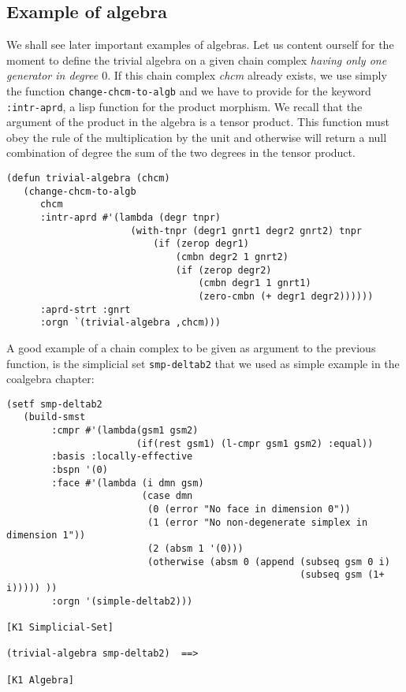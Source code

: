 \subsection {Example of algebra}

We shall see later important examples of algebras. Let us content ourself for the moment
to define the trivial algebra on a given chain complex {\em having only one generator in degree $0$}. 
If  this chain complex {\em chcm} already exists, we
use simply the function {\tt change-chcm-to-algb} and we have to provide for the keyword {\tt :intr-aprd},
a lisp function for the product morphism. We recall that the argument of the product in the algebra is a tensor product.
This function must obey the rule of the multiplication by the unit
and otherwise will return a null combination of degree the sum of the two degrees in the tensor product. 
{\footnotesize\begin{verbatim}
(defun trivial-algebra (chcm)
   (change-chcm-to-algb  
      chcm
      :intr-aprd #'(lambda (degr tnpr)
                      (with-tnpr (degr1 gnrt1 degr2 gnrt2) tnpr
                          (if (zerop degr1) 
                              (cmbn degr2 1 gnrt2)
                              (if (zerop degr2)
                                  (cmbn degr1 1 gnrt1)
                                  (zero-cmbn (+ degr1 degr2))))))
      :aprd-strt :gnrt
      :orgn `(trivial-algebra ,chcm)))
\end{verbatim}}
A good example of  a chain complex to be given as argument to the previous function,
is the simplicial set {\tt smp-deltab2} that we used as
simple example in the coalgebra chapter:
{\footnotesize\begin{verbatim}
(setf smp-deltab2
   (build-smst
        :cmpr #'(lambda(gsm1 gsm2)
                       (if(rest gsm1) (l-cmpr gsm1 gsm2) :equal))
        :basis :locally-effective
        :bspn '(0)
        :face #'(lambda (i dmn gsm)
                        (case dmn
                         (0 (error "No face in dimension 0"))
                         (1 (error "No non-degenerate simplex in dimension 1"))
                         (2 (absm 1 '(0)))
                         (otherwise (absm 0 (append (subseq gsm 0 i)
                                                    (subseq gsm (1+ i))))) ))
        :orgn '(simple-deltab2)))

[K1 Simplicial-Set]

(trivial-algebra smp-deltab2)  ==>

[K1 Algebra]
\end{verbatim}}
